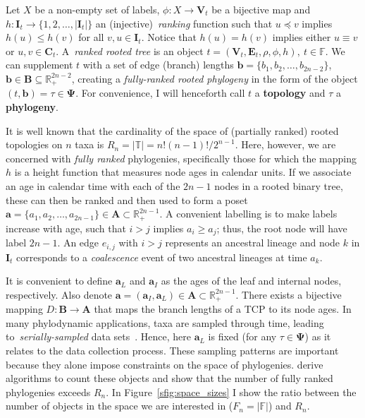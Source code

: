 Let $X$ be a non-empty set of labels, $\phi : X \to \boldsymbol V_t$ be a bijective map and $h : \boldsymbol I_t \to \{1, 2, \ldots, |\boldsymbol I_t|\}$ an (injective)~\textit{ranking} function such that $u \preceq v$ implies $h(u) \leq h(v)$ for all $v,u \in \boldsymbol I_t$. 
Notice that $h(u) = h(v)$ implies either $u \equiv v $ or $u, v \in \boldsymbol C_t$. 
A~\textit{ranked rooted tree} is an object $t = (\boldsymbol V_t, \boldsymbol E_t, \rho, \phi, h),\: t \in \mathbb{F}$.
We can supplement $t$ with a set of edge (branch) lengths $\boldsymbol b = \{b_1, b_2, \ldots, b_{2n-2} \}$, $\boldsymbol b \in \boldsymbol B \subseteq \mathbb{R}_{+}^{2n-2}$, creating a \textit{fully-ranked rooted phylogeny} in the form of the object $(t, \boldsymbol b) = \tau \in \boldsymbol\Psi$.
For convenience, I will henceforth call $t$ a \textbf{topology} and $\tau$ a \textbf{phylogeny}.

It is well known that the cardinality of the space of (partially ranked) rooted topologies on $n$ taxa is $R_n = |\mathbb{T}| = n!(n-1)!/2^{n-1}$.
Here, however, we are concerned with \textit{fully ranked} phylogenies, specifically those for which the mapping $h$ is a height function that measures node ages in calendar units.
If we associate an age in calendar time with each of the $2n-1$ nodes in a rooted binary tree, these can then be ranked and then used to form a poset $\boldsymbol a = \{a_1, a_2, \ldots, a_{2n-1} \} \in \boldsymbol A \subset \mathbb{R}_+^{2n-1}$.
A convenient labelling is to make labels increase with age, such that $i > j$ implies $a_i \geq a_j$; thus, the root node will have label $2n-1$.
An edge $e_{i,j}$ with $i > j$ represents an ancestral lineage and node $k$ in $\boldsymbol I_t$ corresponds to a \textit{coalescence} event of two ancestral lineages at time $a_k$.

It is convenient to define $\boldsymbol a_L$ and $\boldsymbol a_I$ as the ages of the leaf and internal nodes, respectively.
Also denote $\boldsymbol a  = (\boldsymbol a_I , \boldsymbol a_L) \in \boldsymbol A \subset \mathbb{R}_+^{2n-1}$.
There exists a bijective mapping $D : \boldsymbol B \rightarrow \boldsymbol A$ that maps the branch lengths of a TCP to its node ages.
In many phylodynamic applications, taxa are sampled through time, leading to~\textit{serially-sampled} data sets~\citep{Drummond2002}.
Hence, here $\boldsymbol a_L$ is fixed (for any $\tau \in  \boldsymbol \Psi$) as it relates to the data collection process. 
These sampling patterns are important because they alone impose constraints on the space of phylogenies.
\cite{Gavryushkina2013} derive algorithms to count these objects and show that the number of fully ranked phylogenies exceeds $R_n$. 
In Figure~\ref{sfig:space_sizes} I show the ratio between the number of objects in the space we are interested in ($ F_n  = |\mathbb{F}|$) and $R_n$.

